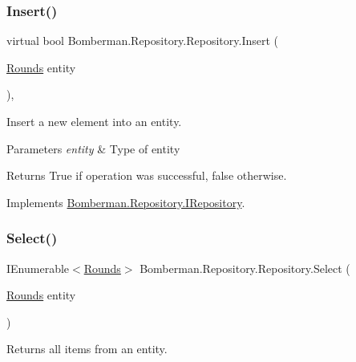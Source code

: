 \subsubsection{\texorpdfstring{Insert()}{Insert()}}
{\footnotesize\ttfamily virtual bool Bomberman.\+Repository.\+Repository.\+Insert (\begin{DoxyParamCaption}\item[{\mbox{\hyperlink{class_bomberman_1_1_data_1_1_rounds}{Rounds}}}]{entity }\end{DoxyParamCaption})\hspace{0.3cm}{\ttfamily [inline]}, {\ttfamily [virtual]}}



Insert a new element into an entity. 


\begin{DoxyParams}{Parameters}
{\em entity} & Type of entity\\
\hline
\end{DoxyParams}
\begin{DoxyReturn}{Returns}
True if operation was successful, false otherwise.
\end{DoxyReturn}


Implements \mbox{\hyperlink{interface_bomberman_1_1_repository_1_1_i_repository_ab117e28c62bf81dee5e699cd9e376588}{Bomberman.\+Repository.\+I\+Repository}}.

\mbox{\label{class_bomberman_1_1_repository_1_1_repository_a3853a77eda150ba9389082a7315413f1}} 
\subsubsection{\texorpdfstring{Select()}{Select()}}
{\footnotesize\ttfamily I\+Enumerable$<$\mbox{\hyperlink{class_bomberman_1_1_data_1_1_rounds}{Rounds}}$>$ Bomberman.\+Repository.\+Repository.\+Select (\begin{DoxyParamCaption}\item[{\mbox{\hyperlink{class_bomberman_1_1_data_1_1_rounds}{Rounds}}}]{entity }\end{DoxyParamCaption})\hspace{0.3cm}{\ttfamily [inline]}}



Returns all items from an entity. 


